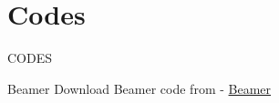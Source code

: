 \documentclass{beamer}
\begin{document}
\section{Codes}
\begin{frame}{CODES}

 \begin{block}{Beamer}
         Download Beamer code from - \href{https://github.com/jarpula-Bhanu/Assignment-11/blob/main/Assignment_11.tex}{Beamer}
    \end{block}
\end{frame} 
\end{document}
